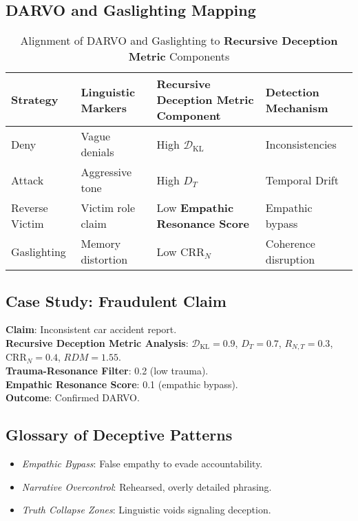 \documentclass[11pt]{article}
\newcommand{\rdm}{\textbf{Recursive Deception Metric}}
\newcommand{\trf}{\textbf{Trauma-Resonance Filter}}
\newcommand{\ers}{\textbf{Empathic Resonance Score}}
\begin{document}
\subsection{DARVO and Gaslighting Mapping}
\begin{table}[htbp]
\small
\centering
\caption{Alignment of DARVO and Gaslighting to \rdm{} Components}
\begin{tabular}{p{2.5cm}p{4cm}p{4cm}p{3cm}}
\toprule
\textbf{Strategy} & \textbf{Linguistic Markers} & \textbf{\rdm{} Component} & \textbf{Detection Mechanism} \\
\midrule
Deny & Vague denials & High \(\mathcal{D}_{\text{KL}}\) & Inconsistencies \\
Attack & Aggressive tone & High \(D_T\) & Temporal Drift \\
Reverse Victim & Victim role claim & Low \ers{} & Empathic bypass \\
Gaslighting & Memory distortion & Low \(\text{CRR}_N\) & Coherence disruption \\
\bottomrule
\end{tabular}
\label{tab:darvo}
\end{table}

\subsection{Case Study: Fraudulent Claim}
\textbf{Claim}: Inconsistent car accident report.\\
\textbf{\rdm{} Analysis}: \(\mathcal{D}_{\text{KL}} = 0.9\), \(D_T = 0.7\), \(R_{N,T} = 0.3\), \(\text{CRR}_N = 0.4\), \(RDM = 1.55\).\\
\textbf{\trf{}}: 0.2 (low trauma).\\
\textbf{\ers{}}: 0.1 (empathic bypass).\\
\textbf{Outcome}: Confirmed DARVO.

\subsection{Glossary of Deceptive Patterns}
\begin{itemize}
    \item \textit{Empathic Bypass}: False empathy to evade accountability.
    \item \textit{Narrative Overcontrol}: Rehearsed, overly detailed phrasing.
    \item \textit{Truth Collapse Zones}: Linguistic voids signaling deception.
\end{itemize}
\end{document}
